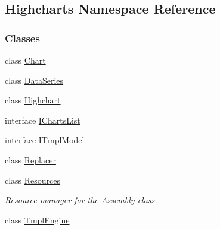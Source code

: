\hypertarget{namespaceHighcharts}{}\subsection{Highcharts Namespace Reference}
\label{namespaceHighcharts}
\subsubsection*{Classes}
\begin{DoxyCompactItemize}
\item 
class \hyperlink{classHighcharts_1_1Chart}{Chart}
\item 
class \hyperlink{classHighcharts_1_1DataSeries}{Data\+Series}
\item 
class \hyperlink{classHighcharts_1_1Highchart}{Highchart}
\item 
interface \hyperlink{interfaceHighcharts_1_1IChartsList}{I\+Charts\+List}
\item 
interface \hyperlink{interfaceHighcharts_1_1ITmplModel}{I\+Tmpl\+Model}
\item 
class \hyperlink{classHighcharts_1_1Replacer}{Replacer}
\item 
class \hyperlink{classHighcharts_1_1Resources}{Resources}
\begin{DoxyCompactList}\small\item\em Resource manager for the Assembly class. \end{DoxyCompactList}\item 
class \hyperlink{classHighcharts_1_1TmplEngine}{Tmpl\+Engine}
\end{DoxyCompactItemize}
